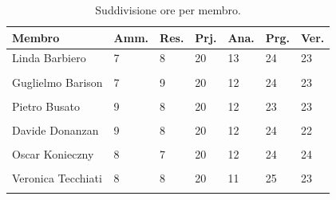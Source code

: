 \documentclass[8pt]{article}
\begin{document}
\begin{table}[ht!]   
	\centering
	\begin{tabular}{C{3cm} C{1cm} C{1cm} C{1cm} C{1cm} C{1cm} C{1cm}}
		\toprule
		\textbf{Membro} & 
		\textbf{Amm.} & 
		\textbf{Res.} & 
		\textbf{Prj.} &
		\textbf{Ana.} &
		\textbf{Prg.} &
		\textbf{Ver.}\\
		\midrule
		Linda Barbiero & 7 & 8  & 20  & 13 & 24  & 23 \\\\ 
		Guglielmo Barison & 7 & 9 & 20 & 12 & 24 & 23 \\\\ 
		Pietro Busato & 9 & 8 & 20 & 12 & 23 & 23 \\\\ 
		Davide Donanzan & 9 & 8 & 20 & 12 & 24 & 22 \\\\ 
		Oscar Konieczny & 8 & 7 & 20 & 12 & 24 & 24 \\\\ 
		Veronica Tecchiati & 8 & 8 & 20 & 11 & 25 & 23 \\\\ 
		\bottomrule
	\end{tabular}
	\caption{Suddivisione ore per membro.}
	\label{table:suddivisioneRuoliMembri}
\end{table}
\newpage
\end{document}
